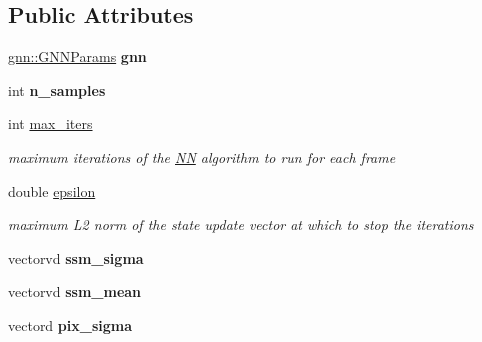 \subsection*{Public Attributes}
\begin{DoxyCompactItemize}
\item 
\hypertarget{structNNParams_a8bbb9a6415ee89fab4b8cf4fb2b6781d}{\hyperlink{structgnn_1_1GNNParams}{gnn\-::\-G\-N\-N\-Params} {\bfseries gnn}}\label{structNNParams_a8bbb9a6415ee89fab4b8cf4fb2b6781d}

\item 
\hypertarget{structNNParams_abb701186a9015ed1a5e95a044237c909}{int {\bfseries n\-\_\-samples}}\label{structNNParams_abb701186a9015ed1a5e95a044237c909}

\item 
\hypertarget{structNNParams_af1ca6425073149941b02ca9c8bc1b4e7}{int \hyperlink{structNNParams_af1ca6425073149941b02ca9c8bc1b4e7}{max\-\_\-iters}}\label{structNNParams_af1ca6425073149941b02ca9c8bc1b4e7}

\begin{DoxyCompactList}\small\item\em maximum iterations of the \hyperlink{classNN}{N\-N} algorithm to run for each frame \end{DoxyCompactList}\item 
\hypertarget{structNNParams_aadf0b0d8d812b124a496dcf169336c69}{double \hyperlink{structNNParams_aadf0b0d8d812b124a496dcf169336c69}{epsilon}}\label{structNNParams_aadf0b0d8d812b124a496dcf169336c69}

\begin{DoxyCompactList}\small\item\em maximum L2 norm of the state update vector at which to stop the iterations \end{DoxyCompactList}\item 
\hypertarget{structNNParams_a200e1906b9dbc841e45372b706b689c3}{vectorvd {\bfseries ssm\-\_\-sigma}}\label{structNNParams_a200e1906b9dbc841e45372b706b689c3}

\item 
\hypertarget{structNNParams_a6b502dce8da220b8ec8c77209cd71c9e}{vectorvd {\bfseries ssm\-\_\-mean}}\label{structNNParams_a6b502dce8da220b8ec8c77209cd71c9e}

\item 
\hypertarget{structNNParams_aeb9344d770f46c31571010359941fff0}{vectord {\bfseries pix\-\_\-sigma}}\label{structNNParams_aeb9344d770f46c31571010359941fff0}


\end{DoxyCompactItemize}
